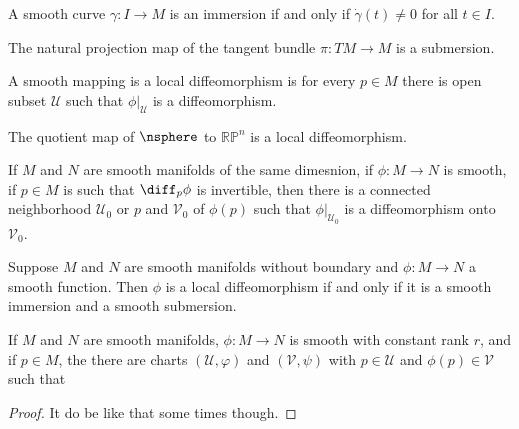 \documentclass{article}                                                        %
\begin{document}
        \begin{example}
            A smooth curve $\gamma:I\rightarrow{M}$ is an immersion if and only
            if $\dot{\gamma}(t)\ne{0}$ for all $t\in{I}$.
        \end{example}
        \begin{example}
            The natural projection map of the tangent bundle
            $\pi:TM\rightarrow{M}$ is a submersion.
        \end{example}
        \begin{definition}
            A smooth mapping is a local diffeomorphism is for every $p\in{M}$
            there is open subset $\mathcal{U}$ such that $\phi|_{\mathcal{U}}$
            is a diffeomorphism.
        \end{definition}
        \begin{example}
            The quotient map of $\nsphere$ to $\mathbb{RP}^{n}$ is a local
            diffeomorphism.
        \end{example}
        \begin{theorem}
            If $M$ and $N$ are smooth manifolds of the same dimesnion, if
            $\phi:M\rightarrow{N}$ is smooth, if $p\in{M}$ is such that
            $\diff_{p}\phi$ is invertible, then there is a connected
            neighborhood $\mathcal{U}_{0}$ or $p$ and $\mathcal{V}_{0}$ of
            $\phi(p)$ such that $\phi|_{\mathcal{U}_{0}}$ is a diffeomorphism
            onto $\mathcal{V}_{0}$.
        \end{theorem}
        \begin{theorem}
            Suppose $M$ and $N$ are smooth manifolds without boundary and
            $\phi:M\rightarrow{N}$ a smooth function. Then $\phi$ is a local
            diffeomorphism if and only if it is a smooth immersion and a smooth
            submersion.
        \end{theorem}
        \begin{theorem}
            If $M$ and $N$ are smooth manifolds, $\phi:M\rightarrow{N}$ is
            smooth with constant rank $r$, and if $p\in{M}$, the there are
            charts $(\mathcal{U},\varphi)$ and $(\mathcal{V},\psi)$ with
            $p\in\mathcal{U}$ and $\phi(p)\in\mathcal{V}$ such that
        \end{theorem}
        \begin{proof}
            It do be like that some times though.
        \end{proof}
\end{document}
